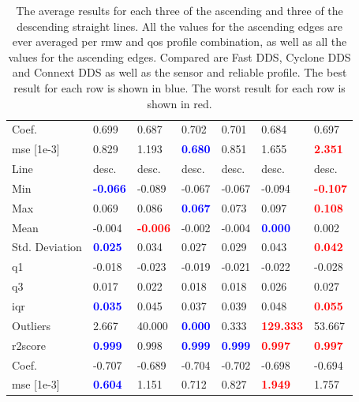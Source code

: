 \begin{table}[htbp]
\begin{tabular}{|l|ll|ll|ll|}
Coef. & 0.699 & 0.687 & 0.702 & 0.701 & 0.684 & 0.697 \\
\gls{mse} [1e-3] & 0.829 & 1.193 & \textcolor{blue}{\textbf{0.680}} & 0.851 & 1.655 & \textcolor{red}{\textbf{2.351}} \\
\midrule
Line & desc. & desc. & desc. & desc. & desc. & desc. \\
Min & \textcolor{blue}{\textbf{-0.066}} & -0.089 & -0.067 & -0.067 & -0.094 & \textcolor{red}{\textbf{-0.107}} \\
Max & 0.069 & 0.086 & \textcolor{blue}{\textbf{0.067}} & 0.073 & 0.097 & \textcolor{red}{\textbf{0.108}} \\
Mean & -0.004 & \textcolor{red}{\textbf{-0.006}} & -0.002 & -0.004 & \textcolor{blue}{\textbf{0.000}} & 0.002 \\
Std. Deviation & \textcolor{blue}{\textbf{0.025}} & 0.034 & 0.027 & 0.029 & 0.043 & \textcolor{red}{\textbf{0.042}} \\
\gls{q1} & -0.018 & -0.023 & -0.019 & -0.021 & -0.022 & -0.028 \\
\gls{q3} & 0.017 & 0.022 & 0.018 & 0.018 & 0.026 & 0.027 \\
\gls{iqr} & \textcolor{blue}{\textbf{0.035}} & 0.045 & 0.037 & 0.039 & 0.048 & \textcolor{red}{\textbf{0.055}} \\
Outliers & 2.667 & 40.000 & \textcolor{blue}{\textbf{0.000}} & 0.333 & \textcolor{red}{\textbf{129.333}} & 53.667 \\
\gls{r2}score & \textcolor{blue}{\textbf{0.999}} & 0.998 & \textcolor{blue}{\textbf{0.999}} & \textcolor{blue}{\textbf{0.999}} & \textcolor{red}{\textbf{0.997}} & \textcolor{red}{\textbf{0.997}} \\
Coef. & -0.707 & -0.689 & -0.704 & -0.702 & -0.698 & -0.694 \\
\gls{mse} [1e-3] & \textcolor{blue}{\textbf{0.604}} & 1.151 & 0.712 & 0.827 & \textcolor{red}{\textbf{1.949}} & 1.757 \\
\bottomrule
\end{tabular}
    \centering
    \caption{The average results for each three of the ascending and three of the descending straight lines. All the values for the ascending edges are ever averaged per \gls{rmw} and \gls{qos} profile combination, as well as all the values for the ascending edges. Compared are Fast DDS, Cyclone DDS and Connext DDS as well as the sensor and reliable profile. The best result for each row is shown in blue. The worst result for each row is shown in red.}
    \label{c6_tab_result_overview}
\end{table}
